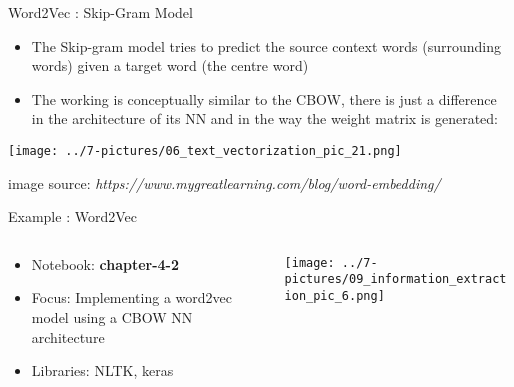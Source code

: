 \documentclass[11pt]{beamer}
\begin{document}
\begin{frame}{Word2Vec : Skip-Gram Model}
	\begin{itemize}
		\item The Skip-gram model tries to predict the source context words (surrounding words) given a target word (the centre word)
		\item The working is conceptually similar to the CBOW, there is just a difference in the architecture of its NN and in the way the weight matrix is generated:	 
	\end{itemize}
	\begin{center}
	\texttt{[image: ../7-pictures/06\_text\_vectorization\_pic\_21.png]}
	\end{center}
	\footnotesize{image source: \textit{https://www.mygreatlearning.com/blog/word-embedding/}}
\end{frame}
\begin{frame}{Example : Word2Vec}
\begin{columns}[T] %
\begin{column}{.48\textwidth}
        \begin{itemize}
		\item Notebook: \textbf{chapter-4-2}
		\item Focus: Implementing a word2vec model using a CBOW NN architecture
		\item Libraries: NLTK, keras
        \end{itemize}
\end{column}%
\hfill%
\begin{column}{.48\textwidth}
        \texttt{[image: ../7-pictures/09\_information\_extraction\_pic\_6.png]}
\end{column}%
\end{columns}
\end{frame}
\end{document}
